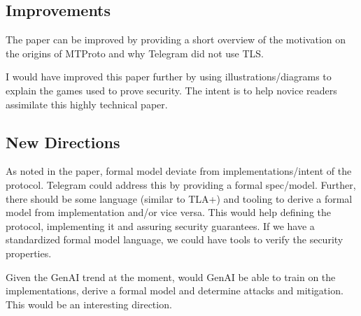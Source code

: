 \documentclass[12pt]{article}
\begin{document}
    \subsection*{Improvements}
    The paper can be improved by providing a short overview of the motivation on the origins of MTProto and why Telegram did not use TLS.
    
    I would have improved this paper further by using illustrations/diagrams to explain the games used to prove security. The intent is to help novice readers assimilate this highly technical paper.

    \subsection*{New Directions}
    As noted in the paper, formal model deviate from implementations/intent of the protocol. Telegram could address this by providing a formal spec/model. Further, there should be some language (similar to TLA+) and tooling to derive a formal model from implementation and/or vice versa. This would help defining the protocol, implementing it and assuring security guarantees. If we have a standardized formal model language, we could have tools to verify the security properties.

    Given the GenAI trend at the moment, would GenAI be able to train on the implementations, derive a formal model and determine attacks and mitigation. This would be an interesting direction.
\end{document}
